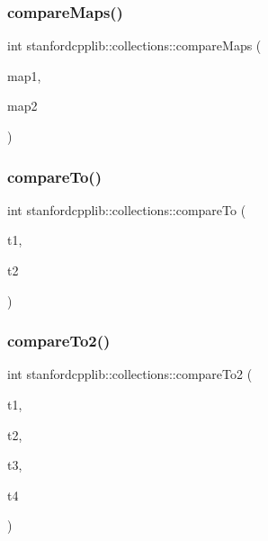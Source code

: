 \subsubsection{\texorpdfstring{compare\+Maps()}{compareMaps()}}
{\footnotesize\ttfamily int stanfordcpplib\+::collections\+::compare\+Maps (\begin{DoxyParamCaption}\item[{const Map\+Type \&}]{map1,  }\item[{const Map\+Type \&}]{map2 }\end{DoxyParamCaption})}

\mbox{\label{namespacestanfordcpplib_1_1collections_a95fe9aa150f4b638394d31c4cf38360b}} 
\subsubsection{\texorpdfstring{compare\+To()}{compareTo()}}
{\footnotesize\ttfamily int stanfordcpplib\+::collections\+::compare\+To (\begin{DoxyParamCaption}\item[{T}]{t1,  }\item[{T}]{t2 }\end{DoxyParamCaption})}

\mbox{\label{namespacestanfordcpplib_1_1collections_a69f00286f1ec18906424498a9a5f6bcc}} 
\subsubsection{\texorpdfstring{compare\+To2()}{compareTo2()}}
{\footnotesize\ttfamily int stanfordcpplib\+::collections\+::compare\+To2 (\begin{DoxyParamCaption}\item[{T1}]{t1,  }\item[{T1}]{t2,  }\item[{T2}]{t3,  }\item[{T2}]{t4 }\end{DoxyParamCaption})}

